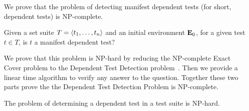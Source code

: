 We prove that the problem of detecting manifest dependent tests (for
short, dependent tests) is NP-complete.


\begin{definition}
Given a set suite\/ $T =  \langle t_1, \dots, t_n \rangle $ and an initial environment\/
$\mathbf{E}_0$, for a given test\/ $t \in T$, is $t$ a manifest dependent test?
\end{definition}

We prove that this problem is NP-hard by reducing the NP-complete Exact Cover problem
to the Dependent Test Detection
problem~\cite{karp:NP:1972}. 
Then we provide a linear time algorithm to verify any answer to the
question.
Together these two parts prove the the Dependent Test Detection Problem is NP-complete.

\begin{theorem}
The problem of determining a dependent test in
a test suite is NP-hard.
\end{theorem}


